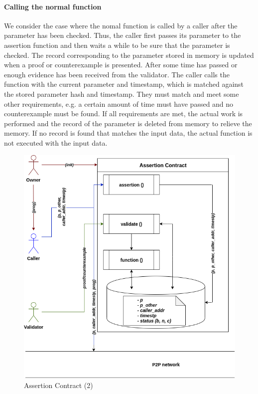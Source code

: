 \documentclass[runningheads]{llncs}
\begin{document}
\paragraph{Calling the normal function}
We consider the case where the nomal function is called by a caller after the parameter has been checked. Thus, the caller first passes its parameter to the assertion function and then waits a while to be sure that the parameter is checked. The record corresponding to the parameter stored in memory is updated when a proof or counterexample is presented. After some time has passed or enough evidence has been received from the validator. The caller calls the function with the current parameter and timestamp, which is matched against the stored parameter hash and timestamp. They must match and meet some other requirements, e.g. a certain amount of time must have passed and no counterexample must be found. If all requirements are met, the actual work is performed and the record of the parameter is deleted from memory to relieve the memory. If no record is found that matches the input data, the actual function is not executed with the input data.


\begin{figure}
\centering
\includegraphics[scale=.6]{assertion_2}
\caption{Assertion Contract (2)}
\end{figure}
\end{document}
